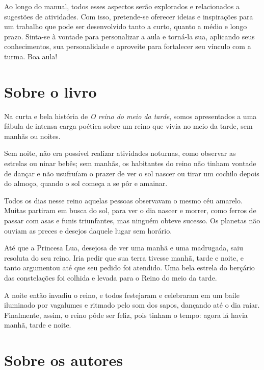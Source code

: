 \documentclass[11pt]{extarticle}
\begin{document}
Ao longo do manual, todos esses aspectos serão explorados e relacionados a sugestões de atividades. Com isso, pretende-se oferecer ideias e inspirações para um trabalho que pode ser desenvolvido tanto a curto, quanto a médio e longo prazo. Sinta-se à vontade para personalizar a aula e torná-la sua, aplicando seus conhecimentos, sua 
personalidade e aproveite para fortalecer seu vínculo com a turma.
Boa aula!

\section{Sobre o livro}
Na curta e bela história de \textit{O reino do meio da tarde}, somos apresentados a uma fábula de intensa carga poética sobre um reino que vivia no meio da tarde, sem manhãs ou noites.

Sem noite, não era possível realizar atividades noturnas, como observar as estrelas ou ninar bebês; sem manhãs, os habitantes do reino não tinham vontade de dançar e não usufruíam o prazer de ver o sol nascer ou tirar um cochilo depois do almoço, quando o sol começa a se pôr e amainar.

Todos os dias nesse reino aquelas pessoas observavam o mesmo céu amarelo. Muitas partiram em busca do sol, para ver o dia nascer e morrer, como ferros de passar com asas e funis triunfantes, mas ninguém obteve sucesso. Os planetas não ouviam as preces e desejos daquele lugar sem horário.

Até que a Princesa Lua, desejosa de ver uma manhã e uma madrugada, saiu resoluta do seu reino. Iria pedir que sua terra tivesse manhã, tarde e noite, e tanto argumentou até que seu pedido foi atendido. Uma bela estrela do berçário das constelações foi colhida e levada para o Reino do meio da tarde.

A noite então invadiu o reino, e todos festejaram e celebraram em um baile iluminado por vagalumes e ritmado pelo som dos sapos, dançando até o dia raiar. Finalmente, assim, o reino pôde ser feliz, pois tinham o tempo: agora lá havia manhã, tarde e noite.

\reversemarginpar
\marginparwidth=5cm



\section{Sobre os autores}
\end{document}
